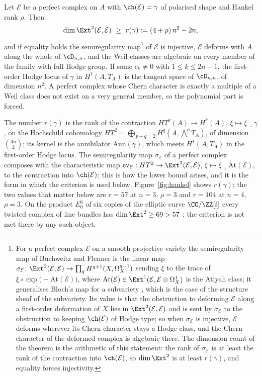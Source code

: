 \begin{theorem}\label{thm:criterion}
Let $\mathcal{E}$ be a perfect complex on $A$ with $\ch(\mathcal{E})=\gamma$ of polarised shape and Hankel rank $\rho$. Then
\[
\dim\Ext^{2}(\mathcal{E},\mathcal{E})\ \ge\ r(\gamma):=(4+\rho)\,n^{2}-2n,
\]
and if equality holds the semiregularity map\footnote{For a perfect complex $\mathcal{E}$ on a smooth projective variety the semiregularity map of Buchweitz and Flenner \cite{BF03} is the linear map $\sigma_{\mathcal{E}}\colon\Ext^{2}(\mathcal{E},\mathcal{E})\to\prod_{q}H^{q+1}(X,\Omega^{q-1}_{X})$ sending $\xi$ to the trace of $\xi\circ\exp\bigl(-\mathrm{At}(\mathcal{E})\bigr)$, where $\mathrm{At}(\mathcal{E})\in\Ext^{1}(\mathcal{E},\mathcal{E}\otimes\Omega^{1}_{X})$ is the Atiyah class; it generalises Bloch's map for a subvariety \cite{Blo72}, which is the case of the structure sheaf of the subvariety. Its value is that the obstruction to deforming $\mathcal{E}$ along a first-order deformation of $X$ lies in $\Ext^{2}(\mathcal{E},\mathcal{E})$ and is sent by $\sigma_{\mathcal{E}}$ to the obstruction to keeping $\ch(\mathcal{E})$ of Hodge type; so when $\sigma_{\mathcal{E}}$ is injective, $\mathcal{E}$ deforms wherever its Chern character stays a Hodge class, and the Chern character of the deformed complex is algebraic there. The dimension count of the theorem is the arithmetic of this statement: the rank of $\sigma_{\mathcal{E}}$ is at least the rank of the contraction into $\ch(\mathcal{E})$, so $\dim\Ext^{2}$ is at least $r(\gamma)$, and equality forces injectivity.} of $\mathcal{E}$ is injective, $\mathcal{E}$ deforms with $A$ along the whole of $\cD_{n,n}$, and the Weil classes are algebraic on every member of the family with full Hodge group. If some $c_{k}\ne0$ with $1\le k\le 2n-1$, the first-order Hodge locus of $\gamma$ in $H^{1}(A,T_{A})$ is the tangent space of $\cD_{n,n}$, of dimension $n^{2}$. A perfect complex whose Chern character is exactly a multiple of a Weil class does not exist on a very general member, so the polynomial part is forced.
\end{theorem}

The number $r(\gamma)$ is the rank of the contraction $HT^{2}(A)\to H^{*}(A)$, $\xi\mapsto\xi\lrcorner\gamma$, on the Hochschild cohomology $HT^{2}=\bigoplus_{p+q=2}H^{q}(A,\bigwedge^{p}T_{A})$, of dimension $\binom{4n}{2}$; its kernel is the annihilator $\mathrm{Ann}(\gamma)$, which meets $H^{1}(A,T_{A})$ in the first-order Hodge locus. The semiregularity map $\sigma_{\mathcal{E}}$ of a perfect complex composes with the characteristic map $\mathrm{ev}_{\mathcal{E}}:HT^{2}\to\Ext^{2}(\mathcal{E},\mathcal{E})$, $\xi\mapsto\xi\lrcorner\mathrm{At}(\mathcal{E})$, to the contraction into $\ch(\mathcal{E})$; this is how the lower bound arises, and it is the form in which the criterion is used below. Figure~\ref{fig:hankel} shows $r(\gamma)$; the two values that matter below are $r=57$ at $n=3$, $\rho=3$ and $r=104$ at $n=4$, $\rho=3$. On the product $E_{0}^{6}$ of six copies of the elliptic curve $\CC/\ZZ[i]$ every twisted complex of line bundles has $\dim\Ext^{2}\ge69>57$ \cite[Thm.~18.35]{BMB26}; the criterion is not met there by any such object.

